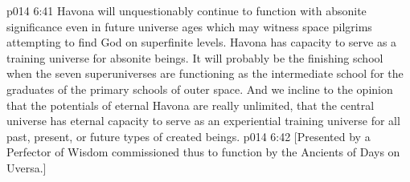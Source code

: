 \pc \vs p014 6:41 Havona will unquestionably continue to function with absonite significance even in future universe ages which may witness space pilgrims attempting to find God on superfinite levels. Havona has capacity to serve as a training universe for absonite beings. It will probably be the finishing school when the seven superuniverses are functioning as the intermediate school for the graduates of the primary schools of outer space. And we incline to the opinion that the potentials of eternal Havona are really unlimited, that the central universe has eternal capacity to serve as an experiential training universe for all past, present, or future types of created beings.
\vsetoff
\vs p014 6:42 [Presented by a Perfector of Wisdom commissioned thus to function by the Ancients of Days on Uversa.]
